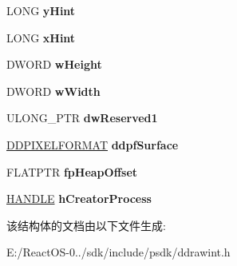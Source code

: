 \begin{DoxyCompactItemize}
\begin{tabbing}
\end{tabbing}\item 
\mbox{\label{struct___d_d___s_u_r_f_a_c_e___g_l_o_b_a_l_aeef7b2331ff957045e2bedf52e23f458}} 
L\+O\+NG {\bfseries y\+Hint}
\item 
\mbox{\label{struct___d_d___s_u_r_f_a_c_e___g_l_o_b_a_l_ab4b14f8135a48cae6dae9fbefc71c6a1}} 
L\+O\+NG {\bfseries x\+Hint}
\item 
\mbox{\label{struct___d_d___s_u_r_f_a_c_e___g_l_o_b_a_l_aac110c856bc4c91682bd5fa152b166fc}} 
D\+W\+O\+RD {\bfseries w\+Height}
\item 
\mbox{\label{struct___d_d___s_u_r_f_a_c_e___g_l_o_b_a_l_a50a86db509a51dcb36678e6086f2881d}} 
D\+W\+O\+RD {\bfseries w\+Width}
\item 
\mbox{\label{struct___d_d___s_u_r_f_a_c_e___g_l_o_b_a_l_aa4892e01683778a83b9f0953ff3b9c1f}} 
U\+L\+O\+N\+G\+\_\+\+P\+TR {\bfseries dw\+Reserved1}
\item 
\mbox{\label{struct___d_d___s_u_r_f_a_c_e___g_l_o_b_a_l_a1bd1c75a86d3774c49b64c45ce556fb7}} 
\hyperlink{struct___d_d_p_i_x_e_l_f_o_r_m_a_t}{D\+D\+P\+I\+X\+E\+L\+F\+O\+R\+M\+AT} {\bfseries ddpf\+Surface}
\item 
\mbox{\label{struct___d_d___s_u_r_f_a_c_e___g_l_o_b_a_l_ad837543f794d6cbb358e447a469bc203}} 
F\+L\+A\+T\+P\+TR {\bfseries fp\+Heap\+Offset}
\item 
\mbox{\label{struct___d_d___s_u_r_f_a_c_e___g_l_o_b_a_l_a238fc86c2538f34a350b6f02f6f25563}} 
\hyperlink{interfacevoid}{H\+A\+N\+D\+LE} {\bfseries h\+Creator\+Process}
\end{DoxyCompactItemize}


该结构体的文档由以下文件生成\+:\begin{DoxyCompactItemize}
\item 
E\+:/\+React\+O\+S-\/0../sdk/include/psdk/ddrawint.\+h\end{DoxyCompactItemize}
